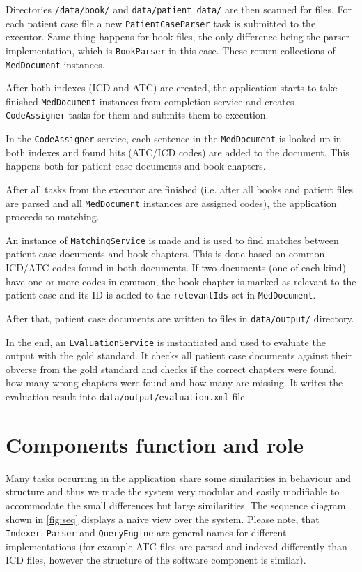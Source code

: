 \documentclass{article}
\begin{document}
Directories \texttt{/data/book/} and \texttt{data/patient\_data/} are then scanned for files. For each patient case file a new \texttt{PatientCaseParser} task is submitted to the executor. Same thing happens for book files, the only difference being the parser implementation, which is \texttt{BookParser} in this case. These return collections of \texttt{MedDocument} instances.

After both indexes (ICD and ATC) are created, the application starts to take finished \texttt{MedDocument} instances from completion service and creates \texttt{CodeAssigner} tasks for them and submits them to execution.

In the \texttt{CodeAssigner} service, each sentence in the \texttt{MedDocument} is looked up in both indexes and found hits (ATC/ICD codes) are added to the document. This happens both for patient case documents and book chapters.

After all tasks from the executor are finished (i.e. after all books and patient files are parsed and all \texttt{MedDocument} instances are assigned codes), the application proceeds to matching.

An instance of \texttt{MatchingService} is made and is used to find matches between patient case documents and book chapters. This is done based on common ICD/ATC codes found in both documents. If two documents (one of each kind) have one or more codes in common, the book chapter is marked as relevant to the patient case and its ID is added to the \texttt{relevantIds} set in \texttt{MedDocument}.

After that, patient case documents are written to files in \texttt{data/output/} directory.

In the end, an \texttt{EvaluationService} is instantiated and used to evaluate the output with the gold standard. It checks all patient case documents against their obverse from the gold standard and checks if the correct chapters were found, how many wrong chapters were found and how many are missing. It writes the evaluation result into \texttt{data/output/evaluation.xml} file.

\section{Components function and role}
Many tasks occurring in the application share some similarities in behaviour and structure and thus we made the system very modular and easily modifiable to accommodate the small differences but large similarities. The sequence diagram shown in \ref{fig:seq} displays a naive view over the system. Please note, that \texttt{Indexer}, \texttt{Parser} and \texttt{QueryEngine} are general names for different implementations (for example ATC files are parsed and indexed differently than ICD files, however the structure of the software component is similar).
\end{document}
